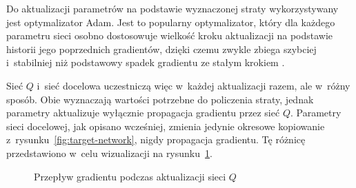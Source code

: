Do aktualizacji parametrów na podstawie wyznaczonej straty wykorzystywany jest
optymalizator Adam. Jest to popularny optymalizator, który dla każdego
parametru sieci osobno dostosowuje wielkość kroku aktualizacji na
podstawie historii jego poprzednich gradientów, dzięki czemu zwykle
zbiega szybciej i~stabilniej niż podstawowy spadek gradientu ze stałym
krokiem \cite{adam_optimizer}.

Sieć $Q$ i~sieć docelowa uczestniczą więc w~każdej aktualizacji razem,
ale w~różny sposób. Obie wyznaczają wartości potrzebne do policzenia
straty, jednak parametry aktualizuje wyłącznie propagacja gradientu
przez sieć $Q$. Parametry sieci docelowej, jak opisano wcześniej,
zmienia jedynie okresowe kopiowanie z~rysunku~\ref{fig:target-network},
nigdy propagacja gradientu. Tę różnicę przedstawiono w~celu wizualizacji na
rysunku~\ref{fig:loss-backprop}.

\begin{figure}[htbp]
    \centering
    \caption{Przepływ gradientu podczas aktualizacji sieci $Q$}
    \label{fig:loss-backprop}
\end{figure}
